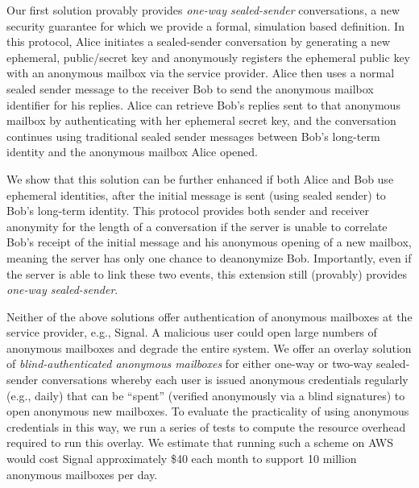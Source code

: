 Our first solution provably provides {\em one-way sealed-sender} conversations, a new security guarantee for which we provide a formal, simulation based definition. In this protocol, Alice %
initiates a sealed-sender conversation by generating a new ephemeral, public/secret key and anonymously registers the ephemeral public key with an anonymous mailbox via the service provider. Alice then uses a normal sealed sender message to the receiver Bob to send the anonymous mailbox identifier for his replies.  Alice can retrieve Bob's replies sent to that anonymous mailbox by authenticating with her ephemeral secret key,
and the conversation continues using traditional sealed sender messages between Bob's long-term identity and the anonymous mailbox Alice opened.

We show that this solution can be further enhanced if both Alice and Bob use ephemeral identities, after the initial message is sent (using sealed sender) to Bob's long-term identity.
This protocol provides both sender and receiver anonymity for the length of a conversation if the server is unable to correlate Bob's receipt of the initial message and his anonymous opening of a new mailbox, meaning the server has only one chance to deanonymize Bob.    Importantly, even if the server is able to link these two events, this extension still (provably) provides {\em one-way sealed-sender}.

Neither of the above solutions offer authentication of anonymous mailboxes at
the service provider, e.g., Signal.  A malicious user could open large numbers
of anonymous mailboxes and degrade the entire system.
We offer an overlay solution of {\em blind-authenticated anonymous mailboxes}
for either one-way or two-way sealed-sender conversations whereby each user is
issued anonymous credentials regularly (e.g., daily) that can be ``spent''
(verified anonymously via a blind signatures) to open anonymous new mailboxes.
To evaluate the practicality of using anonymous credentials in this way, we run
a series of tests to compute the resource overhead required to run this overlay.
We estimate that running such a scheme on AWS would cost Signal approximately
\$40 each month to support 10 million anonymous mailboxes per day.



